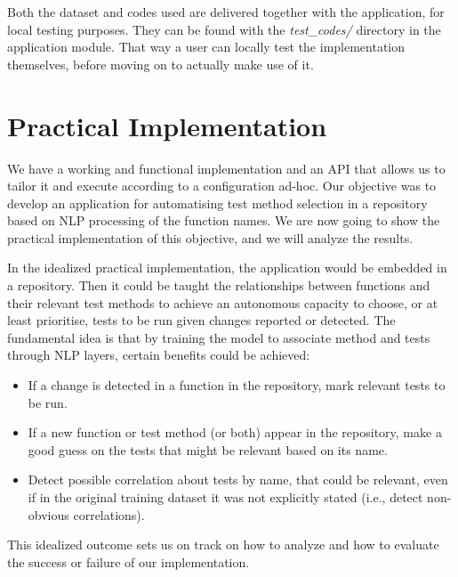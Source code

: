 \documentclass[a4paper, 11pt]{report}
\begin{document}
Both the dataset and codes used are delivered together with the application, for local testing purposes. They can be found with the \textit{test\_codes/} directory in the application module. That way a user can locally test the implementation themselves, before moving on to actually make use of it.

\chapter{Practical Implementation}\label{Implement: Practical}
We have a working and functional implementation and an API that allows us to tailor it and execute according to a configuration ad-hoc. Our objective was to develop an application for automatising test method selection in a repository based on NLP processing of the function names. We are now going to show the practical implementation of this objective, and we will analyze the results.

In the idealized practical implementation, the application would be embedded in a repository. Then it could be taught the relationships between functions and their relevant test methods to achieve an autonomous capacity to choose, or at least prioritise, tests to be run given changes reported or detected. The fundamental idea is that by training the model to associate method and tests through NLP layers, certain benefits could be achieved:

\begin{itemize}
    \item If a change is detected in a function in the repository, mark relevant tests to be run.
    \item If a new function or test method (or both) appear in the repository, make a good guess on the tests that might be relevant based on its name.
    \item Detect possible correlation about tests by name, that could be relevant, even if in the original training dataset it was not explicitly stated (i.e., detect non-obvious correlations).
\end{itemize}

This idealized outcome sets us on track on how to analyze and how to evaluate the success or failure of our implementation.
\end{document}
